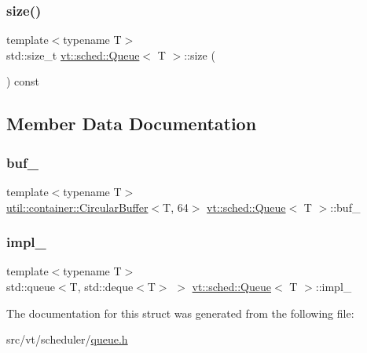 \mbox{\label{structvt_1_1sched_1_1_queue_a0d5cd0a31703541be21f3bbd1590464e}} 
\subsubsection{\texorpdfstring{size()}{size()}}
{\footnotesize\ttfamily template$<$typename T$>$ \\
std\+::size\+\_\+t \hyperlink{structvt_1_1sched_1_1_queue}{vt\+::sched\+::\+Queue}$<$ T $>$\+::size (\begin{DoxyParamCaption}{ }\end{DoxyParamCaption}) const\hspace{0.3cm}{\ttfamily [inline]}}



\subsection{Member Data Documentation}
\mbox{\label{structvt_1_1sched_1_1_queue_a8518d84b809ea6d340e7a0d261533849}} 
\subsubsection{\texorpdfstring{buf\+\_\+}{buf\_}}
{\footnotesize\ttfamily template$<$typename T$>$ \\
\hyperlink{structvt_1_1util_1_1container_1_1_circular_buffer}{util\+::container\+::\+Circular\+Buffer}$<$T, 64$>$ \hyperlink{structvt_1_1sched_1_1_queue}{vt\+::sched\+::\+Queue}$<$ T $>$\+::buf\+\_\+\hspace{0.3cm}{\ttfamily [private]}}

\mbox{\label{structvt_1_1sched_1_1_queue_a68cbe05570c230c55b730d8e98a1f6a5}} 
\subsubsection{\texorpdfstring{impl\+\_\+}{impl\_}}
{\footnotesize\ttfamily template$<$typename T$>$ \\
std\+::queue$<$T, std\+::deque$<$T$>$ $>$ \hyperlink{structvt_1_1sched_1_1_queue}{vt\+::sched\+::\+Queue}$<$ T $>$\+::impl\+\_\+\hspace{0.3cm}{\ttfamily [private]}}



The documentation for this struct was generated from the following file\+:\begin{DoxyCompactItemize}
\item 
src/vt/scheduler/\hyperlink{queue_8h}{queue.\+h}\end{DoxyCompactItemize}
